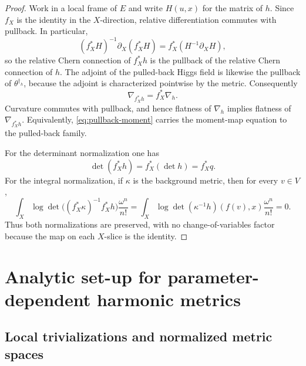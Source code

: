 \documentclass[11pt,reqno]{amsart}
\theoremstyle{definition}
\theoremstyle{remark}
\begin{document}
\begin{proof}
Work in a local frame of $E$ and write $H(u,x)$ for the matrix of
$h$.  Since $f_X$ is the identity in the $X$-direction, relative
differentiation commutes with pullback.  In particular,
\[
 (f_X^*H)^{-1}\partial_X(f_X^*H)
 =f_X^*(H^{-1}\partial_XH),
\]
so the relative Chern connection of $f_X^*h$ is the pullback of the
relative Chern connection of $h$.  The adjoint of the pulled-back Higgs
field is likewise the pullback of $\theta^{\dagger_h}$, because the
adjoint is characterized pointwise by the metric.  Consequently
\[
  \nabla_{f_X^*h}=f_X^*\nabla_h.
\]
Curvature commutes with pullback, and hence flatness of $\nabla_h$
implies flatness of $\nabla_{f_X^*h}$.  Equivalently,
\eqref{eq:pullback-moment} carries the moment-map equation to the
pulled-back family.

For the determinant normalization one has
\[
 \det(f_X^*h)=f_X^*(\det h)=f_X^*q.
\]
For the integral normalization, if $\kappa$ is the background metric,
then for every $v\in V$,
\[
 \int_X\log\det\bigl((f_X^*\kappa)^{-1}f_X^*h\bigr)
             \frac{\omega^n}{n!}
 =\int_X\log\det(\kappa^{-1}h)(f(v),x)
             \frac{\omega^n}{n!}=0.
\]
Thus both normalizations are preserved, with no change-of-variables
factor because the map on each $X$-slice is the identity.
\end{proof}

\section{Analytic set-up for parameter-dependent harmonic metrics}\label{sec:analytic-setup}

\subsection{Local trivializations and normalized metric spaces}
\end{document}
